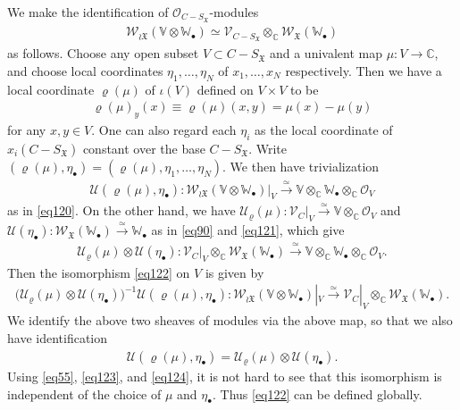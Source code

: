 \documentclass[12pt,a4paper,notitlepage]{report}
\theoremstyle{definition}
\theoremstyle{plain}
\newcommand{\fk}{\mathfrak}
\newcommand{\mc}{\mathcal}
\newcommand{\scr}{\mathscr}
\newcommand{\blt}{\bullet}
\newcommand{\Vbb}{\mathbb V}
\newcommand{\Wbb}{\mathbb W}
\newcommand{\Cbb}{\mathbb C}
\numberwithin{equation}{section}
\begin{document}
We make the identification of $\scr O_{C-S_{\fk X}}$-modules
\begin{align}
\scr W_{\wr\fk X}(\Vbb\otimes\Wbb_\blt)\simeq \scr V_{C-S_{\fk X}}\otimes_\Cbb\scr W_{\fk X}(\Wbb_\blt)\label{eq122}
\end{align}
as follows. Choose any open subset $V\subset C-S_{\fk X}$ and a univalent map $\mu:V\rightarrow \Cbb$, and choose local coordinates $\eta_1,\dots,\eta_N$ of $x_1,\dots,x_N$ respectively. Then we have a local coordinate $\varrho(\mu)$ of $\iota(V)$ defined on $V\times V$ to be
\begin{align}
\varrho(\mu)_y(x)\equiv\varrho(\mu)(x,y)=\mu(x)-\mu(y)\label{eq128}
\end{align}
for any $x,y\in V$. One can also regard each $\eta_i$ as the local coordinate of $x_i(C-S_{\fk X})$ constant over the base $C-S_{\fk X}$. Write $(\varrho(\mu),\eta_\blt)=(\varrho(\mu),\eta_1,\dots,\eta_N)$. We then have trivialization
\begin{align*}
\mc U(\varrho(\mu),\eta_\blt):\scr W_{\wr\fk X}(\Vbb\otimes\Wbb_\blt)|_V\xrightarrow{\simeq} \Vbb\otimes_\Cbb\Wbb_\blt\otimes_\Cbb\scr O_V
\end{align*}
as in \eqref{eq120}. On the other hand, we have $\mc U_\varrho(\mu):\scr V_C|_V\xrightarrow{\simeq}\Vbb\otimes_\Cbb\scr O_V$ and $\mc U(\eta_\blt):\scr W_{\fk X}(\Wbb_\blt)\xrightarrow{\simeq}\Wbb_\blt$ as in \eqref{eq90} and \eqref{eq121}, which give
\begin{align*}
\mc U_\varrho(\mu)\otimes \mc U(\eta_\blt):\scr V_C|_V\otimes_\Cbb\scr W_{\fk X}(\Wbb_\blt)\xrightarrow{\simeq} \Vbb\otimes_\Cbb\Wbb_\blt\otimes_\Cbb\scr O_V.
\end{align*}
Then the isomorphism \eqref{eq122} on $V$ is given by
\begin{align}
\big(\mc U_\varrho(\mu)\otimes \mc U(\eta_\blt)\big)^{-1}\mc U(\varrho(\mu),\eta_\blt):\scr W_{\wr\fk X}(\Vbb\otimes\Wbb_\blt)|_V\xrightarrow{\simeq} \scr V_C|_V\otimes_\Cbb\scr W_{\fk X}(\Wbb_\blt).\label{eq129}
\end{align}
We identify the above two sheaves of modules via the above map, so that we also have identification
\begin{align}
\mc U(\varrho(\mu),\eta_\blt)=\mc U_\varrho(\mu)\otimes \mc U(\eta_\blt).\label{eq126}
\end{align}
Using \eqref{eq55}, \eqref{eq123}, and \eqref{eq124}, it is not hard to see that this isomorphism is independent of the choice of $\mu$ and $\eta_\blt$. Thus \eqref{eq122} can be defined globally.
\end{document}
